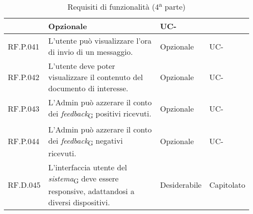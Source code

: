 \begin{table}[H]
\begin{tabular}{|C{2.7cm}|L{7.2cm}|C{2.7cm}|C{2cm}|}
         & Opzionale & UC- \\
        \hline
        RF.P.041 & L’utente può visualizzare l'ora di invio di un messaggio.
         & Opzionale & UC- \\
        \hline
        RF.P.042 & L’utente deve poter visualizzare il contenuto del documento di interesse.
         & Opzionale & UC- \\
        \hline
        RF.P.043 & L'Admin può azzerare il conto dei \textit{feedback}\textsubscript{G} positivi ricevuti.
         & Opzionale & UC- \\
        \hline
        RF.P.044 & L'Admin può azzerare il conto dei \textit{feedback}\textsubscript{G} negativi ricevuti.
         & Opzionale & UC- \\
        \hline
        RF.D.045 & L'interfaccia utente del \textit{sistema}\textsubscript{G} deve essere responsive, adattandosi a diversi dispositivi. & Desiderabile & Capitolato \\
        \hline
    \end{tabular}
    \caption{Requisiti di funzionalità (4\textsuperscript{a}  parte)}
\end{table}

\newpage